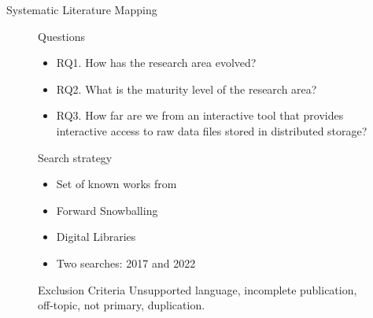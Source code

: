 \documentclass[10pt]{beamer}
\begin{document}
\begin{frame}{Systematic Literature Mapping}
\begin{figure}
    \begin{alertblock}{Questions}
        \begin{itemize}
            \item RQ1. How has the research area evolved?
            \item RQ2. What is the maturity level of the research area?
            \item RQ3. How far are we from an interactive tool that provides interactive access
                to raw data files stored in distributed storage?
        \end{itemize}
    \end{alertblock}
    \begin{block}{Search strategy}
        \begin{itemize}
            \item Set of known works from \cite{Idreos2015}
            \item Forward Snowballing
            \item Digital Libraries
            \item Two searches: 2017 and 2022
        \end{itemize}
    \end{block}
    \begin{block}{Exclusion Criteria}
        \smallskip
        Unsupported language, incomplete publication, off-topic, not primary, duplication.
    \end{block}
\end{figure}
\end{frame}
\end{document}
